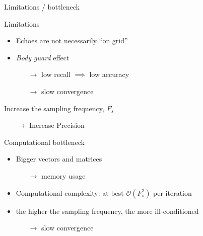 \begin{frame}{Limitations / bottleneck}

    \begin{block}{Limitations}
        \begin{itemize}
        \item Echoes are not necessarily ``on grid''

        \item \emph{Body guard} effect \cite{duval2013}

        \begin{itemize}
            \item[$\longrightarrow$] low recall $\implies$ low accuracy %
            \item[$\longrightarrow$] slow convergence %
        \end{itemize}
        \end{itemize}
    \end{block}

    \vfill

    \begin{block}{Increase the sampling frequency, $F_s$}
        \begin{itemize}
            \item[$\longrightarrow$] Increase Precision
        \end{itemize}
    \end{block}

    \begin{block}{Computational bottleneck}
    \begin{itemize}

        \item Bigger vectors and matrices
        \begin{itemize}
            \item[$\longrightarrow$] memory usage
        \end{itemize}

        \vspace*{.5em}

        \item Computational complexity: at best $\mathcal{O}(F_s^2)$ per iteration

        \item the higher the sampling frequency, the more ill-conditioned \\
        \begin{itemize}
            \item[$\longrightarrow$] slow convergence
        \end{itemize}
        \end{itemize}


\end{block}
\end{frame}
